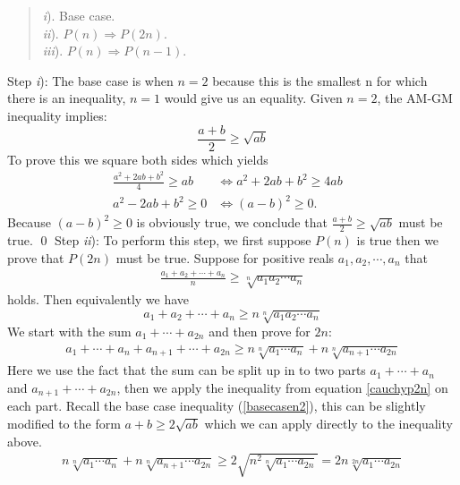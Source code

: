 \documentclass{article}
\begin{document}
	\begin{quote}
		\textit{i}). Base case.\\
		\textit{ii}). $P(n) \Rightarrow P(2n)$.\\
		\textit{iii}). $P(n) \Rightarrow P(n-1)$.
	\end{quote}
	\noindent
	Step \textit{i}): The base case is when $n=2$ because this is the smallest n for which there is an inequality, $n=1$ would give us an equality. Given $n=2$, the AM-GM inequality implies:
	\begin{equation}
		\frac{a+b}{2} \geq \sqrt{ab}
		\label{basecasen2}
	\end{equation}
 	\noindent
	To prove this we square both sides which yields
	\begin{align*}
		\frac{a^2+2ab+b^2}{4} \geq ab &\iff a^2+2ab+b^2 \geq 4ab& \\
		a^2-2ab+b^2 \geq 0 &\iff (a-b)^2 \geq 0.&
	\end{align*}
	Because $(a-b)^2 \geq 0$ is obviously true, we conclude that
	$\frac{a+b}{2} \geq \sqrt{ab}$
	must be true. \qed
	\newline
	Step \textit{ii}): To perform this step, we first suppose $P(n)$ is true then we prove that $P(2n)$ must be true. Suppose for positive reals $a_1,a_2, \cdots, a_n$ that
	\begin{align*}
		\frac{a_1+a_2+ \cdots + a_n}{n} \geq \sqrt[n]{a_1a_2 \cdots a_n}
	\end{align*}
	holds. Then equivalently we have
	\begin{equation}
		a_1+a_2+ \cdots + a_n \geq n\sqrt[n]{a_1a_2 \cdots a_n}
		\label{cauchyp2n}
	\end{equation}
	We start with the sum $a_1+\cdots+a_{2n}$ and then prove for $2n$:
	\begin{align*}
		a_1+\cdots+a_n+a_{n+1}+\cdots+a_{2n} \geq n\sqrt[n]{a_1\cdots a_n} + n\sqrt[n]{a_{n+1}\cdots a_{2n}}
	\end{align*}
	Here we use the fact that the sum can be split up in to two parts $a_1 + \cdots + a_n$ and $a_{n+1} + \cdots + a_{2n}$, then we apply the inequality from equation \ref{cauchyp2n} on each part. Recall the base case inequality (\ref{basecasen2}), this can be slightly modified to the form $a+b \geq 2\sqrt{ab}$ which we can apply directly to the inequality above.
	\begin{align*}
		n\sqrt[n]{a_1\cdots a_n} + n\sqrt[n]{a_{n+1}\cdots a_{2n}} \geq 2\sqrt{n^2\sqrt[n]{a_1\cdots a_{2n}}} = 2n\sqrt[2n]{a_1\cdots a_{2n}}
	\end{align*}
\end{document}
